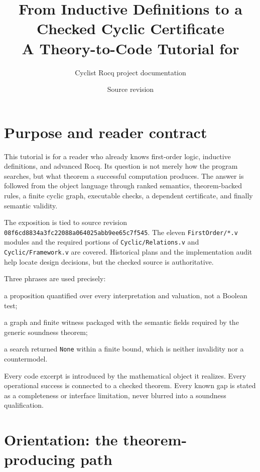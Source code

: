 \documentclass[11pt,oneside]{book}
\title{\textbf{From Inductive Definitions to a Checked Cyclic Certificate}\\[0.7em]
  A Theory-to-Code Tutorial for \file{Rocq-copy/FirstOrder}}
\author{Cyclist Rocq project documentation}
\date{Source revision\\\code{08f6cd8834a3fc22088a064025abb9ee65c7f545}}
\DeclareRobustCommand{\code}[1]{\nolinkurl{#1}}
\DeclareRobustCommand{\file}[1]{\nolinkurl{#1}}
\begin{document}
\hypersetup{pageanchor=false}
\frontmatter
\maketitle
\hypersetup{pageanchor=true}

\chapter*{Purpose and reader contract}

This tutorial is for a reader who already knows first-order logic, inductive
definitions, and advanced Rocq.  Its question is not merely how the program
searches, but what theorem a successful computation produces.  The answer is
followed from the object language through ranked semantics, theorem-backed
rules, a finite cyclic graph, executable checks, a dependent certificate, and
finally semantic validity.

The exposition is tied to source revision
\code{08f6cd8834a3fc22088a064025abb9ee65c7f545}.  The eleven
\file{FirstOrder/*.v} modules and the required portions of
\file{Cyclic/Relations.v} and \file{Cyclic/Framework.v} are covered.  Historical
plans and the implementation audit help locate design decisions, but the
checked source is authoritative.

Three phrases are used precisely:
\begin{description}[leftmargin=3.2cm,style=nextline]
\item[semantic validity] a proposition quantified over every interpretation
and valuation, not a Boolean test;
\item[certified proof] a graph and finite witness packaged with the semantic
fields required by the generic soundness theorem;
\item[bounded non-success] a search returned \code{None} within a finite bound,
which is neither invalidity nor a countermodel.
\end{description}

Every code excerpt is introduced by the mathematical object it realizes.
Every operational success is connected to a checked theorem.  Every known gap
is stated as a completeness or interface limitation, never blurred into a
soundness qualification.

\tableofcontents

\mainmatter

\chapter{Orientation: the theorem-producing path}
\label{ch:orientation}
\end{document}
